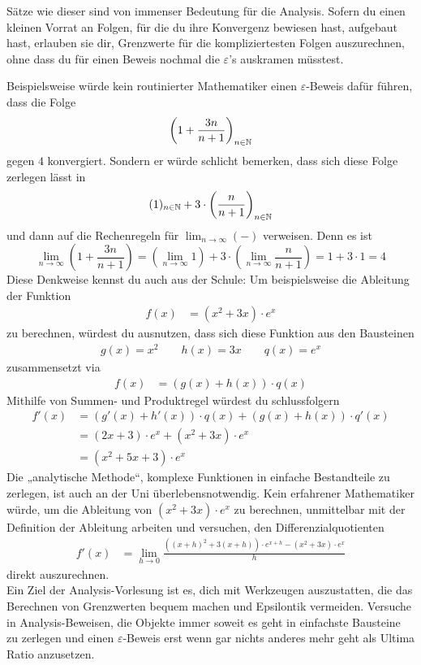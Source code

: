 \begin{bem}
    Sätze wie dieser sind von immenser Bedeutung für die Analysis. Sofern du einen kleinen Vorrat an Folgen, für die du ihre Konvergenz bewiesen hast, aufgebaut hast, erlauben sie dir, Grenzwerte für die kompliziertesten Folgen auszurechnen, ohne dass du für einen Beweis nochmal die $\varepsilon$'s auskramen müsstest.
    
    Beispielsweise würde kein routinierter Mathematiker einen $\varepsilon$-Beweis dafür führen, dass die Folge
        \[ \left( 1 + \frac{3n}{n+1} \right)_{n\in \mathbb N} \]
    gegen $4$ konvergiert. Sondern er würde schlicht bemerken, dass sich diese Folge zerlegen lässt in
        \[ (1)_{n\in \mathbb N} + 3\cdot \left(\frac{n}{n+1}\right)_{n\in \mathbb N} \]
    und dann auf die Rechenregeln für $\lim_{n\to\infty}(-)$ verweisen. Denn es ist
        \[ \lim_{n\to \infty} \left( 1+ \frac{3n}{n+1} \right) = \left( \lim_{n\to \infty} 1 \right)+3\cdot \left( \lim_{n\to \infty} \frac{n}{n+1} \right) = 1+3\cdot 1 = 4 \]
    Diese Denkweise kennst du auch aus der Schule: Um beispielsweise die Ableitung der Funktion
    \begin{align*}
        f(x) &= (x^2+3x)\cdot e^x
    \end{align*}
    zu berechnen, würdest du ausnutzen, dass sich diese Funktion aus den Bausteinen
    \begin{align*}
        g(x) = x^2 \qquad h(x) = 3x \qquad q(x) = e^x
    \end{align*}
    zusammensetzt via
    \begin{align*}
        f(x) & = (g(x)+h(x))\cdot q(x)
    \end{align*}
    Mithilfe von Summen- und Produktregel würdest du schlussfolgern
    \begin{align*}
        f'(x) & = (g'(x)+h'(x))\cdot q(x)  + (g(x)+h(x))\cdot q'(x) \\
        & = (2x+3)\cdot e^x + (x^2+3x)\cdot e^x \\
        & = (x^2+5x+3)\cdot e^x
    \end{align*}
    Die „analytische Methode“, komplexe Funktionen in einfache Bestandteile zu zerlegen, ist auch an der Uni überlebensnotwendig. Kein erfahrener Mathematiker würde, um die Ableitung von $(x^2+3x)\cdot e^x$ zu berechnen, unmittelbar mit der Definition der Ableitung arbeiten und versuchen, den Differenzialquotienten
    \begin{align*}
        f'(x)&=\lim_{h\to 0} \frac{((x+h)^2+3(x+h))\cdot e^{x+h} - (x^2+3x)\cdot e^{x}}{h}
    \end{align*}
    direkt auszurechnen. \\[0.5em]
    Ein Ziel der Analysis-Vorlesung ist es, dich mit Werkzeugen auszustatten, die das Berechnen von Grenzwerten bequem machen und Epsilontik vermeiden. Versuche in Analysis-Beweisen, die Objekte immer soweit es geht in einfachste Bausteine zu zerlegen und einen $\varepsilon$-Beweis erst wenn gar nichts anderes mehr geht als Ultima Ratio anzusetzen.
\end{bem}


